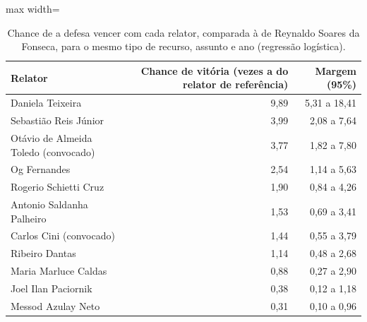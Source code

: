 \begin{table}[h]
\centering\small
\caption{Chance de a defesa vencer com cada relator, comparada à de Reynaldo Soares da Fonseca, para o mesmo tipo de recurso, assunto e ano (regressão logística).}
\label{tab:dados-regressao}
\begin{adjustbox}{max width=\textwidth}
\begin{tabular}{lrr}
\toprule
Relator & Chance de vitória (vezes a do relator de referência) & Margem (95\%) \\
\midrule
Daniela Teixeira & 9,89 & 5,31 a 18,41 \\
Sebastião Reis Júnior & 3,99 & 2,08 a 7,64 \\
Otávio de Almeida Toledo (convocado) & 3,77 & 1,82 a 7,80 \\
Og Fernandes & 2,54 & 1,14 a 5,63 \\
Rogerio Schietti Cruz & 1,90 & 0,84 a 4,26 \\
Antonio Saldanha Palheiro & 1,53 & 0,69 a 3,41 \\
Carlos Cini (convocado) & 1,44 & 0,55 a 3,79 \\
Ribeiro Dantas & 1,14 & 0,48 a 2,68 \\
Maria Marluce Caldas & 0,88 & 0,27 a 2,90 \\
Joel Ilan Paciornik & 0,38 & 0,12 a 1,18 \\
Messod Azulay Neto & 0,31 & 0,10 a 0,96 \\
\bottomrule
\end{tabular}
\end{adjustbox}
\end{table}
